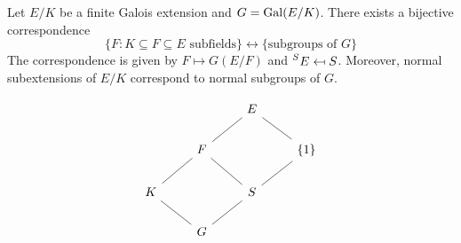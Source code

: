 \chapter{}




\begin{theorem}[Galois]
    Let $E/K$ be a finite Galois extension and $G=\operatorname{Gal}(E/K)$. 
    There exists a bijective correspondence
    \[
    \{F:K\subseteq F\subseteq E\text{ subfields}\}\leftrightarrow
    \{\text{subgroups of $G$}\}
    \]
    The correspondence is given by $F\mapsto G(E/F)$ and 
    $\prescript{S}{}{E}\mapsfrom S$. Moreover, 
    normal subextensions of $E/K$ correspond 
    to normal subgroups of $G$. 
\end{theorem}

\[
\begin{tikzcd}
	&& E \\
	& F && {\{1\}} \\
	K && S \\
	& G
	\arrow[no head, from=1-3, to=2-2]
	\arrow[no head, from=2-2, to=3-1]
	\arrow[no head, from=3-1, to=4-2]
	\arrow[no head, from=4-2, to=3-3]
	\arrow[no head, from=2-2, to=3-3]
	\arrow[no head, from=1-3, to=2-4]
	\arrow[no head, from=2-4, to=3-3]
\end{tikzcd}
\]

